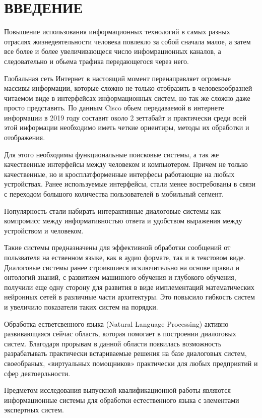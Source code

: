 \chapter*{\MakeUppercase{Введение}}
Повышение использования информационных технологий в самых разных отраслях жизнедеятельности человека повлекло за собой сначала малое, а затем все более и более увеличивающеся число инфомрационных каналов, а следовательно и обьема трафика передающегося через него. 

Глобальная сеть Интернет в настоящий момент перенаправляет огромные массивы информации, которые сложно не только отобразить в человекообразней-читаемом виде в интерфейсах информационных систем, но так же сложно даже просто представить. 
По данным Cisco обьем передаваемой в интернете информации в 2019 году составит около 2 зеттабайт \cite{cisco} и практически среди всей этой информации необходимо иметь четкие ориентиры, методы их обработки и отображения. 

Для этого необходимы функциональные поисковые системы, а так же качественные интерфейсы между человеком и компьютером. Причем не только качественные, но и кросплатформенные интерфесы работающие на любых устройствах. Ранее используемые интерфейсы, стали менее востребованы в связи с переходом большого количества пользователей в мобильный сегмент. 

Популярность стали набирать интерактивные диалоговые системы как компромисс  между информативностью ответа и удобством выражения между устройством и человеком. 

Такие системы предназначены для эффективной обработки сообщений от пользвателя на ественном языке, как в аудио формате, так и в текстовом виде. Диалоговые системы ранее строившиеся исключительно на основе правил и онтологий знаний, с развитием машинного обучения и глубокого обучения, получили еще одну сторону для развития в виде имплементаций математических нейронных сетей в различные части архитектуры. Это повысило гибкость систем и увеличило показатели таких систем на порядки. 

Обработка естветсвенного языка (Natural Language Processing) активно развивающаяся сейчас область, которая помогает в построении диалоговых систем. Благодаря прорывам в данной области появилась возможность разрабатывать практически встариваемые решения на базе диалоговых систем, своеобраных, «виртуальных помощников» практически для любых предприятий и сфер деятоерльности. 

Предметом исследования выпускной квалификационной работы являются информационные системы для обработки естественного языка с элементами экспертных систем. 

